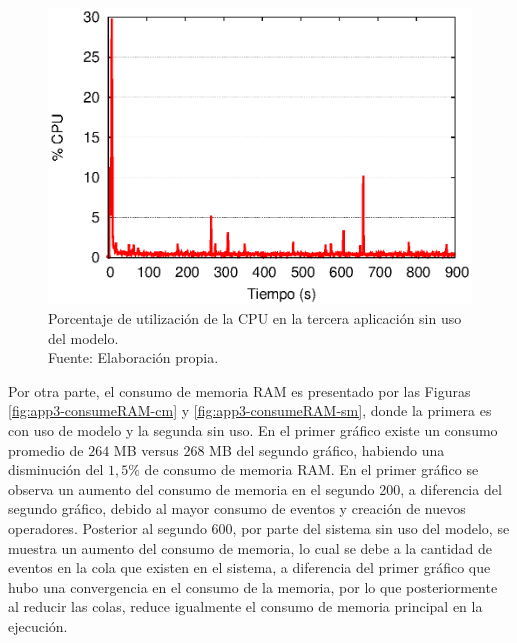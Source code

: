 \begin{figure}[!ht]
	\centering
	\captionsetup{justification=centering}
    \includegraphics[scale=0.65]{images/exp/app3/sm/fisical/consumeCPU.eps}
    \caption[Porcentaje de utilización de la CPU en la tercera aplicación sin uso del modelo.]{Porcentaje de utilización de la CPU en la tercera aplicación sin uso del modelo.\\Fuente: Elaboración propia.}
    \label{fig:app3-consumeCPU-sm}
\end{figure}


Por otra parte, el consumo de memoria RAM es presentado por las Figuras \ref{fig:app3-consumeRAM-cm} y \ref{fig:app3-consumeRAM-sm}, donde la primera es con uso de modelo y la segunda sin uso. En el primer gráfico existe un consumo promedio de $264$ MB versus $268$ MB del segundo gráfico, habiendo una disminución del $1,5\%$ de consumo de memoria RAM. En el primer gráfico se observa un aumento del consumo de memoria en el segundo 200, a diferencia del segundo gráfico, debido al mayor consumo de eventos y creación de nuevos operadores. Posterior al segundo 600, por parte del sistema sin uso del modelo, se muestra un aumento del consumo de memoria, lo cual se debe a la cantidad de eventos en la cola que existen en el sistema, a diferencia del primer gráfico que hubo una convergencia en el consumo de la memoria, por lo que posteriormente al reducir las colas, reduce igualmente el consumo de memoria principal en la ejecución.

